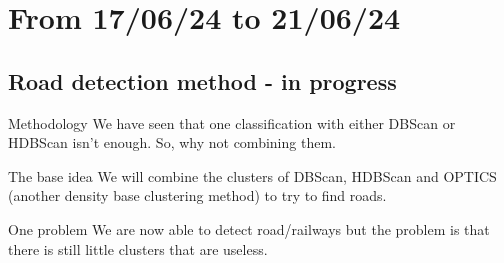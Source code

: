 \smallframetitle

\section{From 17/06/24 to 21/06/24}
\insertsectionframe

\subsection{Road detection method - in progress}
\insertsubsectionframe

\begin{frame}{Methodology}
    We have seen that one classification with either DBScan or HDBScan isn't enough. So, why not combining them.
    \begin{block}{The base idea}
        We will combine the clusters of DBScan, HDBScan and OPTICS (another density base clustering method) to try to find roads.
    \end{block}

    \begin{block}{One problem}
        We are now able to detect road/railways but the problem is that there is still little clusters that are useless.
    \end{block}
\end{frame}


